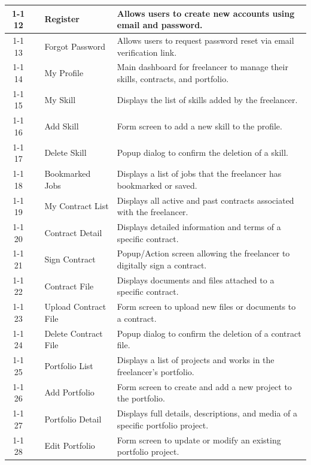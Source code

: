 \begin{longtable}{|c|>{\centering\arraybackslash}m{2.5cm}|p{3.5cm}|p{6cm}|}
\\ \cline{1-1}\cline{3-4}
12 &
&
Register &
Allows users to create new accounts using email and password.
\\ \cline{1-1}\cline{3-4}
13 &
&
Forgot Password &
Allows users to request password reset via email verification link.
\\ \cline{1-1}\cline{3-4}
14 &
&
My Profile &
Main dashboard for freelancer to manage their skills, contracts, and portfolio.
\\ \cline{1-1}\cline{3-4}
15 &
&
My Skill &
Displays the list of skills added by the freelancer.
\\ \cline{1-1}\cline{3-4}
16 &
&
Add Skill &
Form screen to add a new skill to the profile.
\\ \cline{1-1}\cline{3-4}
17 &
&
Delete Skill &
Popup dialog to confirm the deletion of a skill.
\\ \cline{1-1}\cline{3-4}
18 &
&
Bookmarked Jobs &
Displays a list of jobs that the freelancer has bookmarked or saved.
\\ \cline{1-1}\cline{3-4}
19 &
&
My Contract List &
Displays all active and past contracts associated with the freelancer.
\\ \cline{1-1}\cline{3-4}
20 &
&
Contract Detail &
Displays detailed information and terms of a specific contract.
\\ \cline{1-1}\cline{3-4}
21 &
&
Sign Contract &
Popup/Action screen allowing the freelancer to digitally sign a contract.
\\ \cline{1-1}\cline{3-4}
22 &
&
Contract File &
Displays documents and files attached to a specific contract.
\\ \cline{1-1}\cline{3-4}
23 &
&
Upload Contract File &
Form screen to upload new files or documents to a contract.
\\ \cline{1-1}\cline{3-4}
24 &
&
Delete Contract File &
Popup dialog to confirm the deletion of a contract file.
\\ \cline{1-1}\cline{3-4}
25 &
&
Portfolio List &
Displays a list of projects and works in the freelancer's portfolio.
\\ \cline{1-1}\cline{3-4}
26 &
&
Add Portfolio &
Form screen to create and add a new project to the portfolio.
\\ \cline{1-1}\cline{3-4}
27 &
&
Portfolio Detail &
Displays full details, descriptions, and media of a specific portfolio project.
\\ \cline{1-1}\cline{3-4}
28 &
&
Edit Portfolio &
Form screen to update or modify an existing portfolio project.

\end{longtable}
